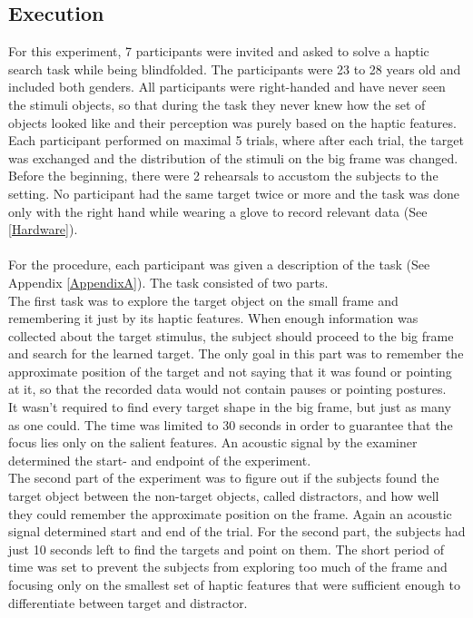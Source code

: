 \subsection{Execution}  
For this experiment, 7 participants were invited and asked to solve a haptic search task while being blindfolded. The participants were 23 to 28 years old and included both genders. All participants were right-handed and have never seen the stimuli objects, so that during the task they never knew how the set of objects looked like and their perception was purely based on the haptic features.\\
Each participant performed on maximal 5 trials, where after each trial, the target was exchanged and the distribution of the stimuli on the big frame was changed. Before the beginning, there were 2 rehearsals to accustom the subjects to the setting. No participant had the same target twice or more and the task was done only with the right hand while wearing a glove to record relevant data (See \ref{Hardware}).\\
\\
For the procedure, each participant was given a description of the task (See Appendix \ref{AppendixA}). The task consisted of two parts. \\
The first task was to explore the target object on the small frame and remembering it just by its haptic features. When enough information was collected about the target stimulus, the subject should proceed to the big frame and search for the learned target. The only goal in this part was to remember the approximate position of the target and not saying that it was found or pointing at it, so that the recorded data would not contain pauses or pointing postures.\\
It wasn't required to find every target shape in the big frame, but just as many as one could. The time was limited to 30 seconds in order to guarantee that the focus lies only on the salient features. An acoustic signal by the examiner determined the start- and endpoint of the experiment.\\
The second part of the experiment was to figure out if the subjects found the target object between the non-target objects, called distractors, and how well they could remember the approximate position on the frame. Again an acoustic signal determined start and end of the trial. For the second part, the subjects had just 10 seconds left to find the targets and point on them. The short period of time was set to prevent the subjects from exploring too much of the frame and focusing only on the smallest set of haptic features that were sufficient enough to differentiate between target and distractor.\\

